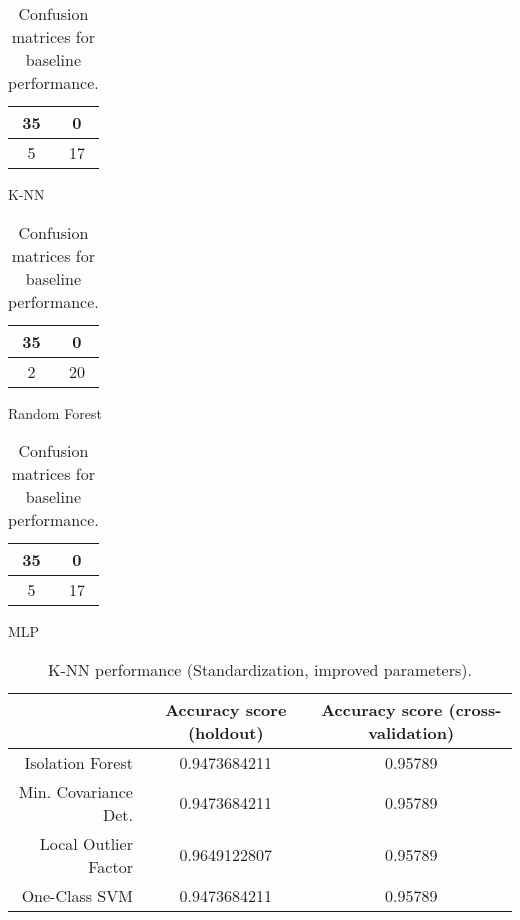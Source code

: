 \documentclass{article}
\begin{document}
\begin{table}[h]
\begin{subtable}[h]{0.3\textwidth}
\centering
\begin{tabular}{c|c}
35 & 0 \\
\hline
5 & 17 \\
\end{tabular}
\caption{K-NN}
\end{subtable}
\hfill
\begin{subtable}[h]{0.3\textwidth}
\centering
\begin{tabular}{c|c}
35 & 0 \\
\hline
2 & 20 \\
\end{tabular}
\caption{Random Forest}
\end{subtable}
\hfill
\begin{subtable}[h]{0.3\textwidth}
\centering
\begin{tabular}{c|c}
35 & 0 \\
\hline
5 & 17 \\
\end{tabular}
\caption{MLP}
\end{subtable}
\caption{Confusion matrices for baseline performance.}
\end{table}

\begin{table}[h]
\begin{center}
\begin{tabular}{r|c|c}
& Accuracy score (holdout) & Accuracy score (cross-validation) \\
\hline
Isolation Forest	& 0.9473684211 & 0.95789 \\
Min. Covariance Det. & 0.9473684211	 & 0.95789 \\
Local Outlier Factor	& 0.9649122807 & 0.95789 \\
One-Class SVM & 0.9473684211	& 0.95789 \\
\end{tabular}
\caption{K-NN performance (Standardization, improved parameters).}
\end{center}
\end{table}
\end{document}
